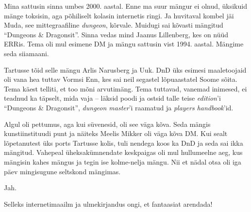 Mina sattusin sinna umbes 2000. aastal. Enne ma suur mängur ei olnud, 
üksikuid mänge toksisin, aga põhiliselt kolasin internetis ringi. Ja huvitaval kombel jäi Muda, see 
mittegraafiline \emph{dungeon}, kõrvale. Muidugi sai kõvasti mängitud 
\enquote{Dungeons \& Dragonsit}. Sinna vedas mind Jaanus 
Lillenberg, kes on nüüd ERRis. Tema oli mul 
esimene DM ja mängu sattusin 
vist 1994. aastal. Mängime seda siiamaani.


Tartusse tõid selle mängu Arlis 
Narusberg ja Uuk. DnD üks esimesi maaletoojaid oli vana 
hea tuttav Vormsi Enn, kes sai neil segastel lõpuaastatel Soome sõita. 
Tema käest telliti, et too mõni arvutimäng. Tema tuttavad, vanemad 
inimesed, ei teadnud ka täpselt, mida vaja -- läksid poodi ja ostsid talle teise 
\emph{edition}'i \enquote{Dungeons \& Dragonsit}, \emph{dungeon master}'i raamatud ja 
\emph{players handbook}'id. 

Algul oli pettumus, aga kui süvenesid, oli see väga kõva. Seda mängis 
kunstiinstituudi punt ja näiteks Meelis Mikker oli väga kõva DM. 
Kui sealt lõpetanutest üks ports Tartusse kolis, tuli nendega koos ka DnD ja 
seda sai ikka mängitud. Vahepeal üheksakümnendate keskpaigas oli mul 
hullumeelne aeg, kus mängisin kahes mängus ja tegin ise kolme-nelja 
mängu. Nii et nädal otsa oli iga päev mingisugune seltskond mängimas.


Jah.


Selleks internetimaailm ja ulmekirjandus ongi, et fantaasiat arendada!

